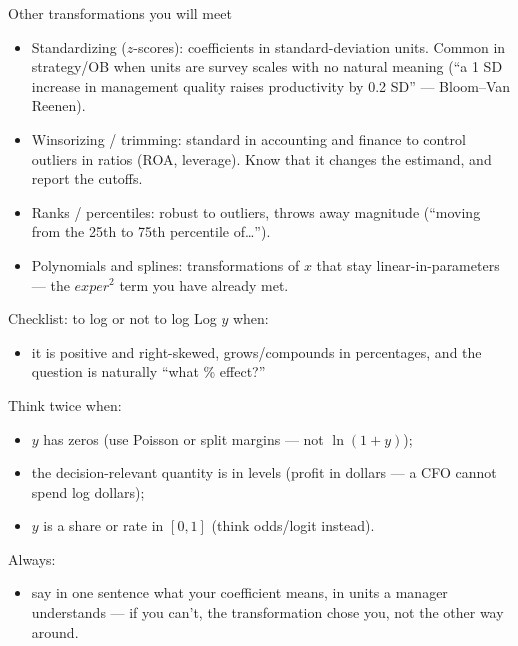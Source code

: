 \documentclass[aspectratio=169,11pt]{beamer}
\begin{document}
\begin{frame}{Other transformations you will meet}
\begin{itemize}
	\item \alert{Standardizing} ($z$-scores): coefficients in standard-deviation
	units. Common in strategy/OB when units are survey scales with no natural meaning
	(``a 1 SD increase in management quality raises productivity by 0.2 SD'' ---
	Bloom--Van Reenen).

	\medskip
	\item \alert{Winsorizing / trimming}: standard in accounting and finance to
	control outliers in ratios (ROA, leverage). Know that it changes the estimand,
	and report the cutoffs.

	\medskip
	\item \alert{Ranks / percentiles}: robust to outliers, throws away magnitude
	(``moving from the 25th to 75th percentile of\dots'').

	\medskip
	\item \alert{Polynomials and splines}: transformations of $x$ that stay
	linear-in-parameters --- the $exper^2$ term you have already met.
\end{itemize}
\end{frame}


\begin{frame}{Checklist: to log or not to log}
Log $y$ when:
\begin{itemize}
	\item it is positive and right-skewed, grows/compounds in percentages, and the
	question is naturally ``what \% effect?''
\end{itemize}
\medskip
Think twice when:
\begin{itemize}
	\item $y$ has \alert{zeros} (use Poisson or split margins --- not $\ln(1+y)$);
	\item the decision-relevant quantity is in \alert{levels} (profit in dollars ---
	a CFO cannot spend log dollars);
	\item $y$ is a \alert{share or rate} in $[0,1]$ (think odds/logit instead).
\end{itemize}
\medskip
Always:
\begin{itemize}
	\item say in one sentence what your coefficient means, in units a manager
	understands --- if you can't, the transformation chose you, not the other way
	around.
\end{itemize}
\end{frame}
\end{document}
